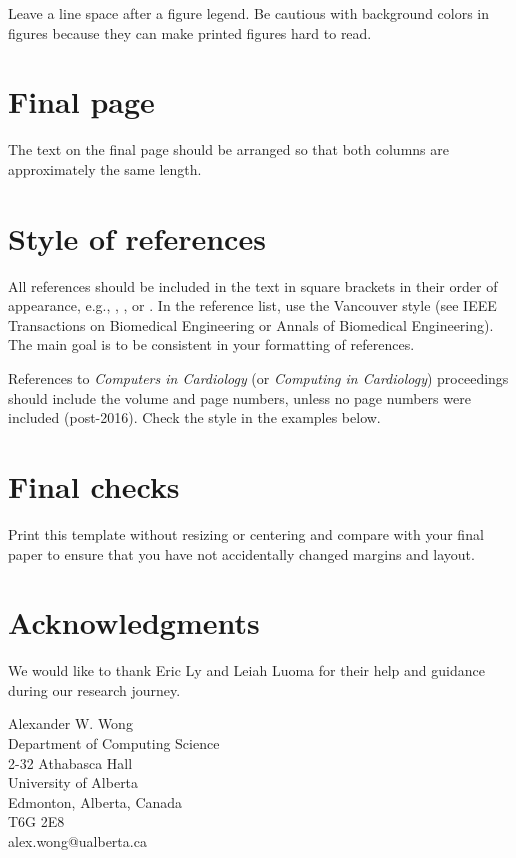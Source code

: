 \documentclass[twocolumn]{cinc}
\begin{document}
Leave a line space after a figure legend. Be cautious with background
colors in figures because they can make printed figures hard to read.

\section{Final page}

The text on the final page should be arranged so that both columns are
approximately the same length.

\balance

\section{Style of references}     

All references should be included in the text in square brackets in their
order of appearance, e.g., \cite{tag}, \cite{tag,ito}, or
\cite{tag,ito,fardel,buncombe}. In the reference list, use the Vancouver
style (see IEEE Transactions on Biomedical Engineering or Annals of
Biomedical Engineering). The main goal is to be consistent in your
formatting of references.

References to \emph{Computers in Cardiology} (or \emph{Computing in
  Cardiology}) proceedings should include the volume and page numbers,
unless no page numbers were included (post-2016). Check the style in the
examples below.


\section{ Final checks }     
 
Print this template without resizing or centering and compare with your
final paper to ensure that you have not accidentally changed margins and
layout.


\section*{Acknowledgments}
We would like to thank Eric Ly and Leiah Luoma for their help and guidance during our research journey.



\begin{correspondence}
Alexander W. Wong\\
Department of Computing Science\\
2-32 Athabasca Hall\\
University of Alberta\\
Edmonton, Alberta, Canada\\
T6G 2E8\\
alex.wong@ualberta.ca
\end{correspondence}
\end{document}

